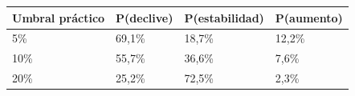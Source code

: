 \begin{tabular}{llll}
\toprule
Umbral práctico & P(declive) & P(estabilidad) & P(aumento) \\
\midrule
5\% & 69,1\% & 18,7\% & 12,2\% \\
10\% & 55,7\% & 36,6\% & 7,6\% \\
20\% & 25,2\% & 72,5\% & 2,3\% \\
\bottomrule
\end{tabular}
